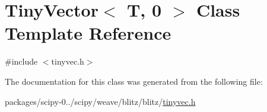 \hypertarget{classTinyVector_3_01T_00_010_01_4}{}\section{Tiny\+Vector$<$ T, 0 $>$ Class Template Reference}
\label{classTinyVector_3_01T_00_010_01_4}


{\ttfamily \#include $<$tinyvec.\+h$>$}



The documentation for this class was generated from the following file\+:\begin{DoxyCompactItemize}
\item 
packages/scipy-\/0../scipy/weave/blitz/blitz/\hyperlink{tinyvec_8h}{tinyvec.\+h}\end{DoxyCompactItemize}
